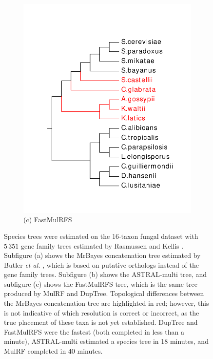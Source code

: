 \begin{figure}[!h]
\begin{subfigure}[t]{0.31\textwidth}
		\includegraphics[width=\textwidth]{figures/fastmulrfs-fig3c.pdf}
		\caption{(c) FastMulRFS} 
	\end{subfigure}
   \caption{Species trees were estimated on the 16-taxon fungal dataset with $5\,351$ gene family trees estimated by Rasmussen and Kellis \cite{rasmussen2012unified}. 
   Subfigure (a) shows the MrBayes concatenation tree estimated by Butler {\em et al.} \cite{butler2009evolution}, which is based on putative orthologs instead of the gene family trees.
   Subfigure (b) shows the ASTRAL-multi tree, and subfigure (c) shows the FastMulRFS tree, which is the same tree produced by MulRF and DupTree.
   Topological differences between the MrBayes concatenation tree are highlighted in red; however, this is not indicative of which resolution is correct or incorrect, as the true placement of these taxa is not yet established.
   DupTree and FastMulRFS were the fastest (both completed in less than a minute), ASTRAL-multi estimated a species tree in 18 minutes, and MulRF completed in 40 minutes.}
   \label{fig:fungi}
\end{figure}

